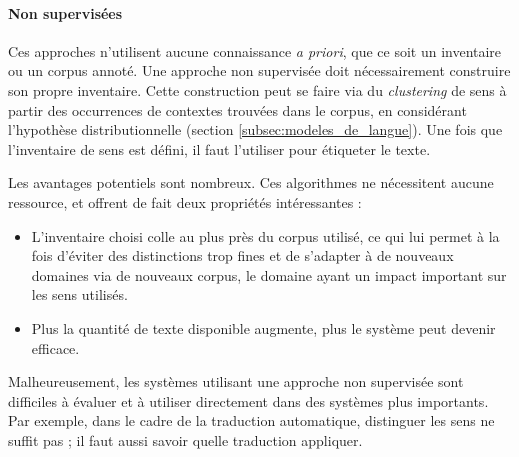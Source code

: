 \paragraph{Non supervisées}

Ces approches n'utilisent aucune connaissance \textit{a priori}, que ce soit un
inventaire ou un corpus annoté. Une approche non supervisée doit nécessairement
construire son propre inventaire. Cette construction peut se faire via du
\textit{clustering} de sens à partir des occurrences de contextes trouvées dans
le corpus, en considérant l'hypothèse distributionnelle (section
\ref{subsec:modeles_de_langue}). Une fois que l'inventaire de sens est défini, il
faut l'utiliser pour étiqueter le texte.

Les avantages potentiels sont nombreux. Ces algorithmes ne nécessitent aucune
ressource, et offrent de fait deux propriétés intéressantes :

\begin{itemize}

    \item L'inventaire choisi colle au plus près du corpus utilisé, ce qui lui
        permet à la fois d'éviter des distinctions trop fines et de s'adapter à
        de nouveaux domaines via de nouveaux corpus, le domaine ayant un impact
        important sur les sens utilisés.

    \item Plus la quantité de texte disponible augmente, plus le système peut
        devenir efficace.

\end{itemize}

Malheureusement, les systèmes utilisant une approche non supervisée sont
difficiles à évaluer et à utiliser directement dans des systèmes plus
importants. Par exemple, dans le cadre de la traduction automatique, distinguer
les sens ne suffit pas ; il faut aussi savoir quelle traduction appliquer.

